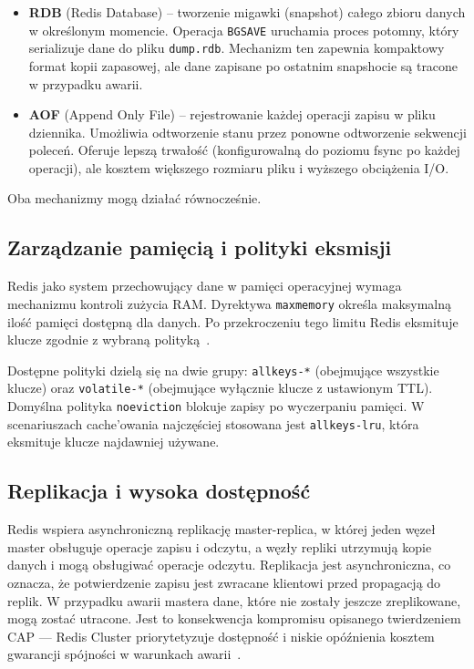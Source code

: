 \begin{itemize}
    \item \textbf{RDB} (Redis Database) -- tworzenie migawki (snapshot) całego zbioru danych w określonym momencie. Operacja \texttt{BGSAVE} uruchamia proces potomny, który serializuje dane do pliku \texttt{dump.rdb}. Mechanizm ten zapewnia kompaktowy format kopii zapasowej, ale dane zapisane po ostatnim snapshocie są tracone w przypadku awarii.
    \item \textbf{AOF} (Append Only File) -- rejestrowanie każdej operacji zapisu w pliku dziennika. Umożliwia odtworzenie stanu przez ponowne odtworzenie sekwencji poleceń. Oferuje lepszą trwałość (konfigurowalną do poziomu fsync po każdej operacji), ale kosztem większego rozmiaru pliku i wyższego obciążenia I/O.
\end{itemize}

Oba mechanizmy mogą działać równocześnie.

\subsection{Zarządzanie pamięcią i polityki eksmisji}

Redis jako system przechowujący dane w pamięci operacyjnej wymaga mechanizmu kontroli zużycia RAM. Dyrektywa \texttt{maxmemory} określa maksymalną ilość pamięci dostępną dla danych. Po przekroczeniu tego limitu Redis eksmituje klucze zgodnie z wybraną polityką~\cite{redisEviction}.

Dostępne polityki dzielą się na dwie grupy: \texttt{allkeys-*} (obejmujące wszystkie klucze) oraz \texttt{volatile-*} (obejmujące wyłącznie klucze z ustawionym TTL). Domyślna polityka \texttt{noeviction} blokuje zapisy po wyczerpaniu pamięci. W scenariuszach cache'owania najczęściej stosowana jest \texttt{allkeys-lru}, która eksmituje klucze najdawniej używane. 

\subsection{Replikacja i wysoka dostępność}

Redis wspiera asynchroniczną replikację master-replica, w której jeden węzeł master obsługuje operacje zapisu i odczytu, a węzły repliki utrzymują kopie danych i mogą obsługiwać operacje odczytu. Replikacja jest asynchroniczna, co oznacza, że potwierdzenie zapisu jest zwracane klientowi przed propagacją do replik. W przypadku awarii mastera dane, które nie zostały jeszcze zreplikowane, mogą zostać utracone. Jest to konsekwencja kompromisu opisanego twierdzeniem CAP --- Redis Cluster priorytetyzuje dostępność i niskie opóźnienia kosztem gwarancji spójności w warunkach awarii~\cite{brewer2012}.

